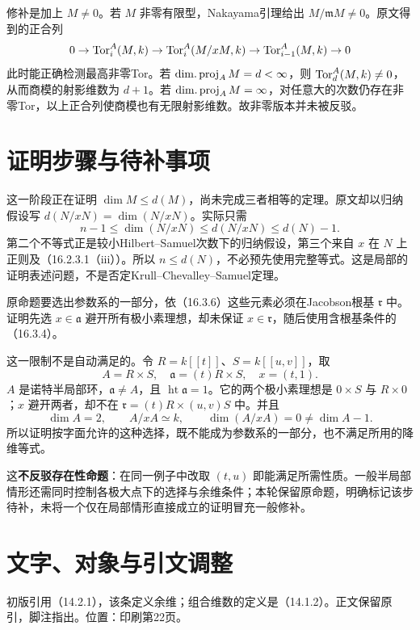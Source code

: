 修补是加上 $M\ne0$。若 $M$ 非零有限型，Nakayama引理给出 $M/\mathfrak mM\ne0$。原文得到的正合列
\[
 0\to\operatorname{Tor}_i^A(M,k)\to\operatorname{Tor}_i^A(M/xM,k)
 \to\operatorname{Tor}_{i-1}^A(M,k)\to0
\]
此时能正确检测最高非零Tor。若 $\operatorname{dim.proj}_A M=d<\infty$，则 $\operatorname{Tor}_d^A(M,k)\ne0$，从而商模的射影维数为 $d+1$。若 $\operatorname{dim.proj}_A M=\infty$，对任意大的次数仍存在非零Tor，以上正合列使商模也有无限射影维数。故非零版本并未被反驳。

\section{证明步骤与待补事项}
这一阶段正在证明 $\dim M\leq d(M)$，尚未完成三者相等的定理。原文却以归纳假设写
$d(N/xN)=\dim(N/xN)$。实际只需
\[
 n-1\leq\dim(N/xN)\leq d(N/xN)\leq d(N)-1.
\]
第二个不等式正是较小Hilbert--Samuel次数下的归纳假设，第三个来自 $x$ 在 $N$ 上正则及（16.2.3.1（iii））。所以 $n\leq d(N)$，不必预先使用完整等式。这是局部的证明表述问题，不是否定Krull--Chevalley--Samuel定理。

原命题要选出参数系的一部分，依（16.3.6）这些元素必须在Jacobson根基 $\mathfrak r$ 中。证明先选 $x\in\mathfrak a$ 避开所有极小素理想，却未保证 $x\in\mathfrak r$，随后使用含根基条件的（16.3.4）。

这一限制不是自动满足的。令 $R=k[[t]]$、$S=k[[u,v]]$，取
\[
 A=R\times S,\quad\mathfrak a=(t)R\times S,\quad x=(t,1).
\]
$A$ 是诺特半局部环，$\mathfrak a\ne A$，且 $\operatorname{ht}\mathfrak a=1$。它的两个极小素理想是 $0\times S$ 与 $R\times0$；$x$ 避开两者，却不在
$\mathfrak r=(t)R\times(u,v)S$ 中。并且
\[
 \dim A=2,\qquad A/xA\simeq k,\qquad\dim(A/xA)=0\ne\dim A-1.
\]
所以证明按字面允许的这种选择，既不能成为参数系的一部分，也不满足所用的降维等式。

这\textbf{不反驳存在性命题}：在同一例子中改取 $(t,u)$ 即能满足所需性质。一般半局部情形还需同时控制各极大点下的选择与余维条件；本轮保留原命题，明确标记该步待补，未将一个仅在局部情形直接成立的证明冒充一般修补。

\section{文字、对象与引文调整}
初版引用（14.2.1），该条定义余维；组合维数的定义是（14.1.2）。正文保留原引，脚注指出。位置：印刷第22页。

